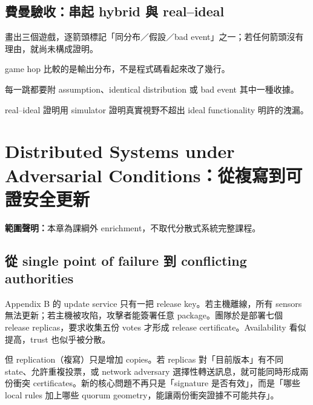 \documentclass[11pt,a4paper,oneside,openany]{book}
\begin{document}
\section{費曼驗收：串起 hybrid 與 real--ideal}
\begin{feynmancheck}
畫出三個遊戲，逐箭頭標記「同分布／假設／bad event」之一；若任何箭頭沒有理由，就尚未構成證明。
\end{feynmancheck}
\begin{chapterrecap}
\item game hop 比較的是輸出分布，不是程式碼看起來改了幾行。
\item 每一跳都要附 assumption、identical distribution 或 bad event 其中一種收據。
\item real--ideal 證明用 simulator 證明真實視野不超出 ideal functionality 明許的洩漏。
\end{chapterrecap}

\chapter{Distributed Systems under Adversarial Conditions：從複寫到可證安全更新}
\label{app:distributed}
\noindent\textbf{範圍聲明：}本章為課綱外 enrichment，不取代分散式系統完整課程。

\section{從 single point of failure 到 conflicting authorities}
Appendix B 的 update service 只有一把 release key。若主機離線，所有 sensors 無法更新；若主機被攻陷，攻擊者能簽署任意 package。團隊於是部署七個 release replicas，要求收集五份 votes 才形成 release certificate。Availability 看似提高，trust 也似乎被分散。

但 replication（複寫）只是增加 copies。若 replicas 對「目前版本」有不同 state、允許重複投票，或 network adversary 選擇性轉送訊息，就可能同時形成兩份衝突 certificates。新的核心問題不再只是「signature 是否有效」，而是「哪些 local rules 加上哪些 quorum geometry，能讓兩份衝突證據不可能共存」。
\end{document}
